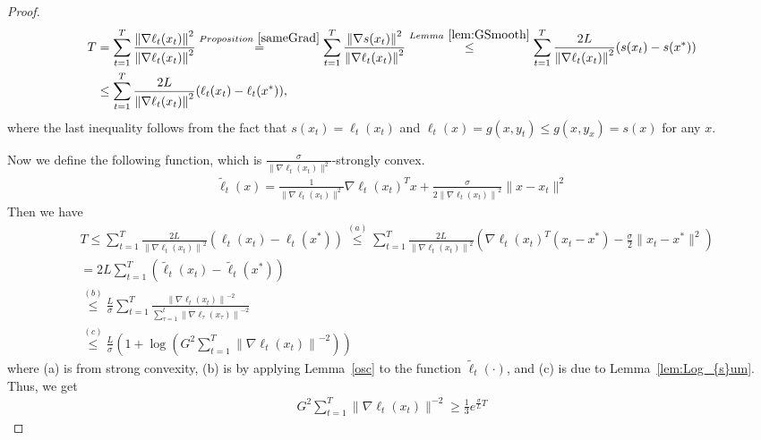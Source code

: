 \documentclass[pmlr]{jmlr} %
\newcommand{\norm}[1]{\left\lVert#1\right\rVert}
\newcommand{\norme}[1]{\norm{#1}}
\newcommand{\yx}[1]{y_{#1}}
\newcommand{\pr}[1]{\left(#1\right)}
\begin{document}
\begin{proof}
\begin{align}
T &= \sum_{t=1}^{T} \frac{\norme{ \nabla \ell_{t}(x_{t})}^{2}}{\norme{ \nabla \ell_{t}(x_{t})}^{2}}
\overset{Proposition~\ref{sameGrad}}{ = }\sum_{t=1}^{T} \frac{\norme{\nabla s(x_{t})}^{2}}{\norme{ \nabla \ell_{t}(x_{t})}^{2}}
\overset{Lemma~\ref{lem:GSmooth}}{ \le} \sum_{t=1}^{T} \frac{2L}{\norme{ \nabla \ell_{t}(x_{t})}^{2}} (s(x_{t}) - s(x^{*}))\\
&\le \sum_{t=1}^{T} \frac{2L}{\norme{ \nabla \ell_{t}(x_{t})}^{2}} (\ell_{t}(x_{t}) - \ell_{t}(x^{*}))\label{eq:normal},
\end{align}
where the last inequality follows from the fact that $s(x_{t}) = \ell_{t}(x_{t})$ and $\ell_{t}(x) = g(x,y_{t}) \le g(x,\yx{x}) = s(x)$ for any $x$.

Now we define the following function, which is $\frac{\sigma}{\|\nabla \ell_{t}(x_{t})\|^{2}}$-strongly convex.
\begin{align} \label{tf}
\tilde{\ell}_{t}(x) = \frac{1}{\| \nabla \ell_{t}(x_{t})\|^{2} }\nabla \ell_{t}(x_{t})^{T} x + \frac{\sigma}{2\norme{\nabla \ell_{t}(x_{t})}^{2}} \| x - x_{t}\|^{2}
\end{align}
Then we have
\begin{equation} \label{tmyt}
\begin{aligned}
& T \leq \sum_{t=1}^{T} \frac{2L}{\norme{ \nabla \ell_{t}(x_{t})}^{2}} (\ell_{t}(x_{t}) - \ell_{t}(x^{*}))
\overset{(a)}{\le} \sum_{t=1}^{T} \frac{2 L}{\norme{ \nabla \ell_{t}(x_{t})}^{2}} (\nabla \ell_{t}(x_{t})^{T} (x_{t} - x^{*}) - \frac{\sigma}{2} \| x_{t} - x^{*}\|^{2})\\
&= 2L \sum_{t=1}^{T} \pr{\tilde{\ell}_{t}(x_{t}) - \tilde{\ell}_{t} (x^{*})}\\
&\overset{(b)}{\le} \frac{L}{\sigma} \sum_{t=1}^{T} \frac{\norme{\nabla \ell_{t}(x_{t})}^{-2}}{\sum_{\tau = 1}^{t} \norme{\nabla \ell_{\tau}(x_{\tau})}^{-2}}\\
&\overset{(c)}{\le} \frac{L}{\sigma} \pr{1 + \log \pr{G^{2} \sum_{t=1}^{T} \norme{\nabla \ell_{t}(x_{t})}^{-2}}}
\end{aligned}
\end{equation}
where (a) is from strong convexity, (b) is by applying Lemma~\ref{osc} to the function $\tilde{\ell}_{t}(\cdot)$, and (c) is due to Lemma~\ref{lem:Log_{s}um}. 
Thus, we get
\begin{align} \label{eq:exp}
G^{2} \sum_{t=1}^{T} \| \nabla \ell_{t}(x_{t}) \|^{-2} \ge \frac{1}{3} e^{\frac{\sigma}{L}T}
\end{align}
\end{proof}
\end{document}
